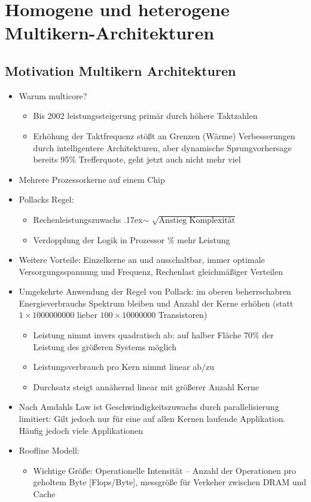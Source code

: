 \section{Homogene und heterogene Multikern-Architekturen}
\subsection{Motivation Multikern Architekturen}
\begin{itemize}
	\item
		Warum multicore?
		\begin{itemize}
			\item
				Bis 2002 leistungssteigerung primär durch höhere Taktzahlen
			\item
				Erhöhung der Taktfrequenz stößt an Grenzen (Wärme) \Ra{} Verbesserungen durch intelligentere Architekturen, aber dynamische Sprungvorhersage bereits 95\% Trefferquote, geht jetzt auch nicht mehr viel
		\end{itemize}
	\item
		Mehrere Prozessorkerne auf einem Chip
	\item
		Pollacks Regel:
		\begin{itemize}
			\item
				Rechenleistungszuwachs {\raise.17ex\hbox{$\scriptstyle\sim$}} $\sqrt{\text{Anstieg Komplexität}}$
			\item
				Verdopplung der Logik in Prozessor \% mehr Leistung
		\end{itemize}
	\item
		Weitere Vorteile: Einzelkerne an und ausschaltbar, immer optimale Versorgungsspannung und Frequenz, Rechenlast gleichmäßiger Verteilen
	\item
		Umgekehrte  Anwendung der Regel von Pollack: im oberen beherrschabren Energieverbrauchs Spektrum bleiben und Anzahl der Kerne erhöhen (statt $1\times1000000000$ lieber $100\times10000000$ Transistoren)
		\begin{itemize}
			\item
				Leistung nimmt invers quadratisch ab: auf halber Fläche 70\% der Leistung des größeren Systems möglich
			\item
				Leistungsverbrauch pro Kern nimmt linear ab/zu
			\item
				Durchsatz steigt annähernd linear mit größerer Anzahl Kerne
		\end{itemize}
	\item
		Nach Amdahls Law ist Geschwindigkeitszuwachs durch parallelisierung limitiert: Gilt jedoch nur für eine auf allen Kernen laufende Applikation. Häufig jedoch viele Applikationen
	\item
		Roofline Modell:
		\begin{itemize}
			\item
				Wichtige Größe: Operationelle Intensität -- Anzahl der Operationen pro geholtem Byte [Flops/Byte], messgröße für Verkeher zwischen DRAM und Cache
		\end{itemize}
\end{itemize}
